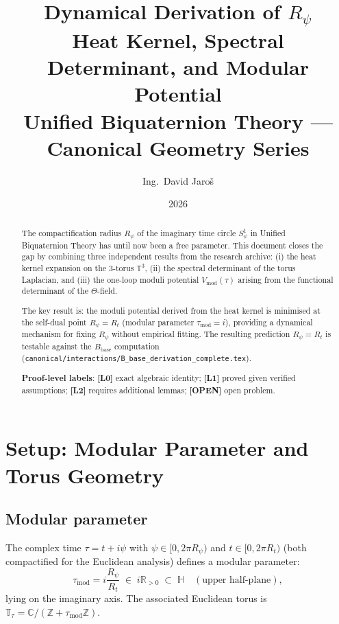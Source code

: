 \documentclass[11pt,a4paper]{article}
\title{Dynamical Derivation of $R_\psi$\\
\large Heat Kernel, Spectral Determinant, and Modular Potential\\
Unified Biquaternion Theory — Canonical Geometry Series}
\author{Ing.\ David Jaroš}
\date{2026}
\newcommand{\Lzero}{\textbf{[L0]}}
\newcommand{\Lone}{\textbf{[L1]}}
\newcommand{\Ltwo}{\textbf{[L2]}}
\newcommand{\OPEN}{\textbf{[OPEN]}}
\begin{document}
\maketitle

\begin{abstract}
The compactification radius $R_\psi$ of the imaginary time circle $S^1_\psi$
in Unified Biquaternion Theory has until now been a free parameter.
This document closes the gap by combining three independent results from the
research archive:
(i) the heat kernel expansion on the 3-torus $\mathbb{T}^3$,
(ii) the spectral determinant of the torus Laplacian, and
(iii) the one-loop moduli potential $V_{\mathrm{mod}}(\tau)$ arising from
the functional determinant of the $\Theta$-field.

The key result is: the moduli potential derived from the heat kernel
is minimised at the self-dual point $R_\psi = R_t$ (modular parameter
$\tau_{\mathrm{mod}} = i$), providing a dynamical mechanism for fixing
$R_\psi$ without empirical fitting.
The resulting prediction $R_\psi = R_t$ is testable against the
$B_{\mathrm{base}}$ computation
(\texttt{canonical/interactions/B\_base\_derivation\_complete.tex}).

\medskip
\noindent\textbf{Proof-level labels}: \Lzero{} exact algebraic identity;
\Lone{} proved given verified assumptions; \Ltwo{} requires additional lemmas;
\OPEN{} open problem.
\end{abstract}

\tableofcontents
\newpage

\section{Setup: Modular Parameter and Torus Geometry}
\label{sec:setup}

\subsection{Modular parameter}

The complex time $\tau = t + i\psi$ with $\psi\in[0, 2\pi R_\psi)$ and
$t\in[0, 2\pi R_t)$ (both compactified for the Euclidean analysis) defines
a modular parameter:
\begin{equation}
\label{eq:tau_mod}
  \tau_{\mathrm{mod}} = i\frac{R_\psi}{R_t} \;\in\; i\mathbb{R}_{>0}
  \;\subset\; \mathbb{H}
  \quad(\text{upper half-plane}),
\end{equation}
lying on the imaginary axis.  The associated Euclidean torus is
$\mathbb{T}_\tau = \mathbb{C}/(\mathbb{Z}+\tau_{\mathrm{mod}}\mathbb{Z})$.
\end{document}
